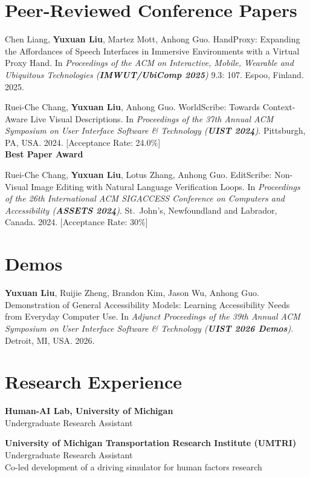 \documentclass[11pt,letterpaper]{article}
\newlength{\marginlabel}
\newcommand{\entry}[2]{%
  \par\noindent
  \makebox[0pt][r]{\parbox[t]{\marginlabel}{\raggedleft\itshape #1}\hspace{0.75em}}%
  \parbox[t]{\linewidth}{#2}\par\vspace{1.15ex}}
\newcommand{\pub}[2]{%
  \par\noindent
  \makebox[0pt][r]{\textbf{[#1]}\hspace{0.75em}}%
  \parbox[t]{\linewidth}{#2}\par\vspace{1.0ex}}
\newcommand{\me}{\textbf{Yuxuan Liu}}
\newcommand{\venue}[1]{\textup{\textbf{#1}}}
\newcommand{\award}[1]{\\\textbf{#1}}
\begin{document}
\section{Peer-Reviewed Conference Papers}
\pub{C.3}{Chen Liang, \me, Martez Mott, Anhong Guo. HandProxy: Expanding the
  Affordances of Speech Interfaces in Immersive Environments with a Virtual Proxy
  Hand. In \textit{Proceedings of the ACM on Interactive, Mobile, Wearable and
  Ubiquitous Technologies (\venue{IMWUT/UbiComp 2025})} 9.3: 107. Espoo, Finland.
  2025.}

\pub{C.2}{Ruei-Che Chang, \me, Anhong Guo. WorldScribe: Towards Context-Aware Live
  Visual Descriptions. In \textit{Proceedings of the 37th Annual ACM Symposium on
  User Interface Software \& Technology (\venue{UIST 2024})}. Pittsburgh, PA, USA.
  2024. [Acceptance Rate: 24.0\%]
  \award{Best Paper Award}}

\pub{C.1}{Ruei-Che Chang, \me, Lotus Zhang, Anhong Guo. EditScribe: Non-Visual
  Image Editing with Natural Language Verification Loops. In \textit{Proceedings of
  the 26th International ACM SIGACCESS Conference on Computers and Accessibility
  (\venue{ASSETS 2024})}. St.\ John's, Newfoundland and Labrador, Canada. 2024.
  [Acceptance Rate: 30\%]}

\section{Demos}
\pub{D.1}{\me, Ruijie Zheng, Brandon Kim, Jason Wu, Anhong
  Guo. Demonstration of General Accessibility Models: Learning Accessibility Needs
  from Everyday Computer Use. In \textit{Adjunct Proceedings of the 39th Annual ACM
  Symposium on User Interface Software \& Technology (\venue{UIST 2026 Demos})}.
  Detroit, MI, USA. 2026.}

\section{Research Experience}
\entry{04/2023 --\\05/2025}{%
  \textbf{Human-AI Lab, University of Michigan}\\
  Undergraduate Research Assistant}

\entry{01/2023 --\\12/2023}{%
  \textbf{University of Michigan Transportation Research Institute (UMTRI)}\\
  Undergraduate Research Assistant\\
  Co-led development of a driving simulator for human factors research}
\end{document}
